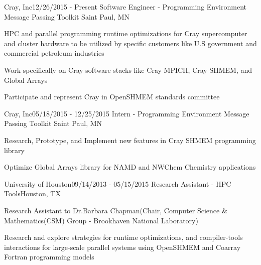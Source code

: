 \begin{rSubsection}{Cray, Inc}{12/26/2015 - Present}
                   {Software Engineer - Programming Environment Message Passing Toolkit}
                   {Saint Paul, MN}
\item HPC and parallel programming runtime optimizations for Cray supercomputer
      and cluster hardware to be utilized by specific customers like U.S
      government and commercial petroleum industries
\item Work specifically on Cray software stacks like Cray MPICH, Cray SHMEM, and
      Global Arrays
\item Participate and represent Cray in OpenSHMEM standards committee
\end{rSubsection}

\begin{rSubsection}{Cray, Inc}{05/18/2015 - 12/25/2015}
                   {Intern - Programming Environment Message Passing Toolkit}
                   {Saint Paul, MN}
\item Research, Prototype, and Implement new features in Cray SHMEM programming
      library
\item Optimize Global Arrays library for NAMD and NWChem Chemistry applications
\end{rSubsection}

\begin{rSubsection}{University of Houston}{09/14/2013 - 05/15/2015}
                   {Research Assistant - HPC Tools}{Houston, TX}
\item Research Assistant to Dr.Barbara Chapman(Chair, Computer Science
      \& Mathematics(CSM) Group - Brookhaven National Laboratory)
\item Research and explore strategies for runtime optimizations, and
      compiler-tools interactions for large-scale parallel systems using
      OpenSHMEM and Coarray Fortran programming models
\end{rSubsection}
